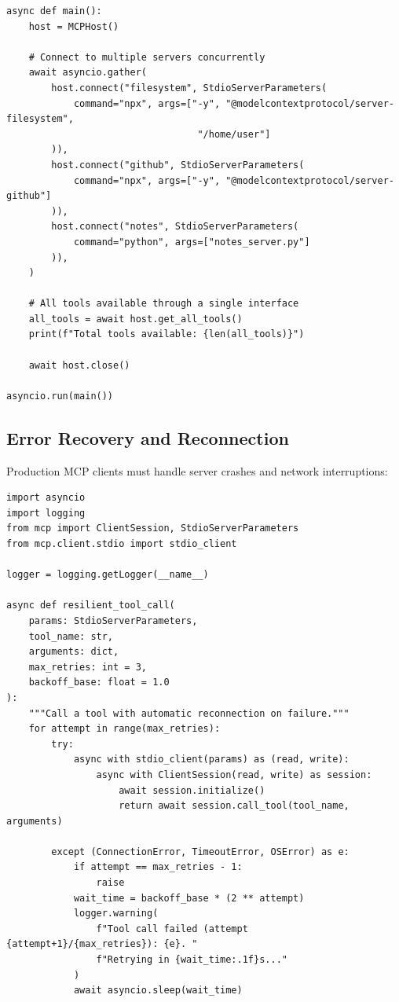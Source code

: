 \begin{lstlisting}[style=pythonstyle, caption={Multi-Server MCP Host Pattern}]
async def main():
    host = MCPHost()

    # Connect to multiple servers concurrently
    await asyncio.gather(
        host.connect("filesystem", StdioServerParameters(
            command="npx", args=["-y", "@modelcontextprotocol/server-filesystem",
                                  "/home/user"]
        )),
        host.connect("github", StdioServerParameters(
            command="npx", args=["-y", "@modelcontextprotocol/server-github"]
        )),
        host.connect("notes", StdioServerParameters(
            command="python", args=["notes_server.py"]
        )),
    )

    # All tools available through a single interface
    all_tools = await host.get_all_tools()
    print(f"Total tools available: {len(all_tools)}")

    await host.close()

asyncio.run(main())
\end{lstlisting}

\subsection{Error Recovery and Reconnection}
\label{error-recovery-and-reconnection}

Production MCP clients must handle server crashes and network interruptions:

\begin{lstlisting}[style=pythonstyle, caption={Resilient MCP Connection with Retry Logic}]
import asyncio
import logging
from mcp import ClientSession, StdioServerParameters
from mcp.client.stdio import stdio_client

logger = logging.getLogger(__name__)

async def resilient_tool_call(
    params: StdioServerParameters,
    tool_name: str,
    arguments: dict,
    max_retries: int = 3,
    backoff_base: float = 1.0
):
    """Call a tool with automatic reconnection on failure."""
    for attempt in range(max_retries):
        try:
            async with stdio_client(params) as (read, write):
                async with ClientSession(read, write) as session:
                    await session.initialize()
                    return await session.call_tool(tool_name, arguments)

        except (ConnectionError, TimeoutError, OSError) as e:
            if attempt == max_retries - 1:
                raise
            wait_time = backoff_base * (2 ** attempt)
            logger.warning(
                f"Tool call failed (attempt {attempt+1}/{max_retries}): {e}. "
                f"Retrying in {wait_time:.1f}s..."
            )
            await asyncio.sleep(wait_time)
\end{lstlisting}


